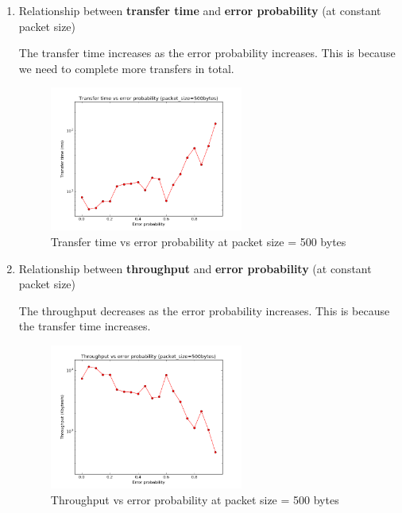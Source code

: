 \documentclass[a4paper]{article}
\numberwithin{equation}{section}
\begin{document}
\begin{enumerate}
\item Relationship between \textbf{transfer time} and \textbf{error probability} (at constant packet size)

The transfer time increases as the error probability increases. This is because we need to complete more transfers in total.

\begin{figure}[h!]
	\centering
	\includegraphics[page=1,width=0.60\textwidth]{Ex4/timeVprobability.png}
	\caption{\label{fig:diagram}{Transfer time vs error probability at packet size = 500 bytes}}
\end{figure}

\item Relationship between \textbf{throughput} and \textbf{error probability} (at constant packet size)

The throughput decreases as the error probability increases. This is because the transfer time increases.

\begin{figure}[h!]
	\centering
	\includegraphics[page=1,width=0.60\textwidth]{Ex4/throughputVprobability.png}
	\caption{\label{fig:diagram}{Throughput vs error probability at packet size = 500 bytes}}
\end{figure}

\end{enumerate}
\end{document}

